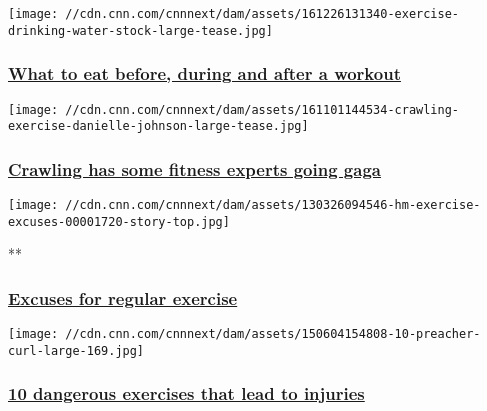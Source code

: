 \href{/2016/12/29/health/what-to-eat-exercise/index.html}{}

\texttt{[image: //cdn.cnn.com/cnnnext/dam/assets/161226131340-exercise-drinking-water-stock-large-tease.jpg]}

\hypertarget{what-to-eat-before-during-and-after-a-workout}{%
\subsubsection{\texorpdfstring{\href{/2016/12/29/health/what-to-eat-exercise/index.html}{What
to eat before, during and after a
workout}}{What to eat before, during and after a workout}}\label{what-to-eat-before-during-and-after-a-workout}}

\href{/2016/11/16/health/crawling-exercise-fitness/index.html}{}

\texttt{[image: //cdn.cnn.com/cnnnext/dam/assets/161101144534-crawling-exercise-danielle-johnson-large-tease.jpg]}

\hypertarget{crawling-has-some-fitness-experts-going-gaga}{%
\subsubsection{\texorpdfstring{\href{/2016/11/16/health/crawling-exercise-fitness/index.html}{Crawling
has some fitness experts going
gaga}}{Crawling has some fitness experts going gaga}}\label{crawling-has-some-fitness-experts-going-gaga}}

\href{/videos/health/2013/03/26/hm-exercise-excuses.cnn}{}

\texttt{[image: //cdn.cnn.com/cnnnext/dam/assets/130326094546-hm-exercise-excuses-00001720-story-top.jpg]}

**

\hypertarget{excuses-for-regular-exercise}{%
\subsubsection{\texorpdfstring{\href{/videos/health/2013/03/26/hm-exercise-excuses.cnn}{Excuses
for regular
exercise}}{Excuses for regular exercise}}\label{excuses-for-regular-exercise}}

\href{/2015/06/05/health/exercises-injuries/index.html}{}

\texttt{[image: //cdn.cnn.com/cnnnext/dam/assets/150604154808-10-preacher-curl-large-169.jpg]}

\hypertarget{10-dangerous-exercises-that-lead-to-injuries-}{%
\subsubsection{\texorpdfstring{\href{/2015/06/05/health/exercises-injuries/index.html}{10
dangerous exercises that lead to injuries
}}{10 dangerous exercises that lead to injuries }}\label{10-dangerous-exercises-that-lead-to-injuries-}}

